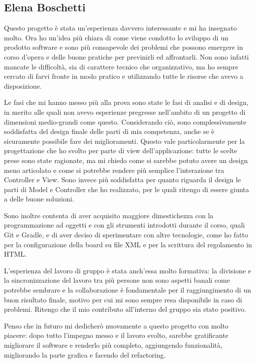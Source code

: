 \documentclass[a4paper,12pt]{report}
\begin{document}
\subsection{Elena Boschetti}

Questo progetto è stata un'esperienza davvero interessante e mi ha insegnato molto. Ora ho un'idea più chiara di come viene condotto lo sviluppo di un prodotto software e sono più consapevole dei problemi che possono emergere in corso d'opera e delle buone pratiche per previnirli ed affrontarli. Non sono infatti mancate le difficoltà, sia di carattere tecnico che organizzativo, ma ho sempre cercato di farvi fronte in modo pratico e utilizzando tutte le risorse che avevo a disposizione.

Le fasi che mi hanno messo più alla prova sono state le fasi di analisi e di design, in merito alle quali non avevo esperienze pregresse nell'ambito di un progetto di dimensioni medio-grandi come questo. Considerando ciò, sono complessivamente soddisfatta del design finale delle parti di mia competenza, anche se è sicuramente possibile fare dei miglioramenti. Questo vale particolarmente per la progettazione che ho svolto per parte di view dell'applicazione: tutte le scelte prese sono state ragionate, ma mi chiedo come si sarebbe potuto avere un design meno articolato e come si potrebbe rendere più semplice l'interazione tra Controller e View. Sono invece più soddisfatta per quanto riguarda il design le parti di Model e Controller che ho realizzato, per le quali ritengo di essere giunta a delle buone soluzioni.

Sono inoltre contenta di aver acquisito maggiore dimestichezza con la programmazione ad oggetti e con gli strumenti introdotti durante il corso, quali Git e Gradle, e di aver deciso di sperimentare con altre tecnologie, come ho fatto per la configurazione della board su file XML e per la scrittura del regolamento in HTML.

L'esperienza del lavoro di gruppo è stata anch'essa molto formativa: la divisione e la sincronizzazione del lavoro tra più persone non sono aspetti banali come potrebbe sembrare e la collaborazione è fondamentale per il raggiungimento di un buon risultato finale, motivo per cui mi sono sempre resa disponibile in caso di problemi. Ritengo che il mio contributo all'interno del gruppo sia stato positivo.

Penso che in futuro mi dedicherò nuovamente a questo progetto con molto piacere: dopo tutto l'impegno messo e il lavoro svolto, sarebbe gratificante migliorare il software e renderlo più completo, aggiungendo funzionalità, migliorando la parte grafica e facendo del refactoring.
\end{document}
